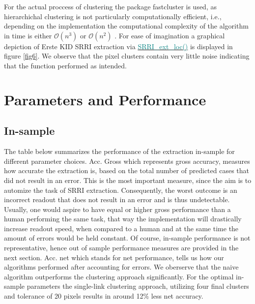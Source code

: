 \documentclass[aodsor,preprint]{imsart}
\numberwithin{equation}{section}
\theoremstyle{plain}
\begin{document}
 For the actual proccess of clustering the package fastcluster is used, as hierarchichal clustering is not particularly computationally efficient, i.e., depending on the implementation the computational complexity of the algorithm in time is either $\mathcal{O}(n^3)$ or $\mathcal{O}(n^2)$ \citep{JSSv053i09, Rok09}. For ease of imagination a graphical depiction of Erste KID SRRI extraction via \href{https://github.com/Base-R-Best-R/KID/blob/main/Code/Package/KIDs/R/SRRI_ext_loc.R}{\textcolor{teal}{SRRI\_ext\_loc()}} is displayed in figure \ref{fig6}. We observe that the pixel clusters contain very little noise indicating that the function performed as intended.


\section{Parameters and Performance} 
\subsection{In-sample}
The table below summarizes the performance of the extraction in-sample for different parameter choices. Acc. Gross which represents gross accuracy, measures how accurate the extraction is, based on the total number of predicted cases that did not result in an error. This is the most important measure, since the aim is to automize the task of SRRI extraction. Consequently, the worst outcome is an incorrect readout that does not result in an error and is thus undetectable. Usually, one would aspire to have equal or higher gross performance than a human performing the same task, that way the implementation will drastically increase readout speed, when compared to a human and at the same time the amount of errors would be held constant. Of course, in-sample performance is not representative, hence out of sample performance measures are provided in the next section. Acc. net which stands for net performance, tells us how our algorithms performed after accounting for errors. We oberserve that the naive algorithm outperforms the clustering approach significantly. For the optimal in-sample parameters the single-link clustering approach, utilizing four final clusters and tolerance of 20 pixels results in around 12\% less net accuracy.
\end{document}
